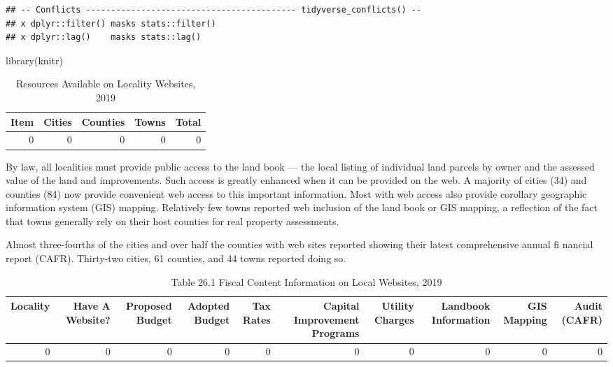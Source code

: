 \documentclass[
]{book}
\newenvironment{Shaded}{\begin{snugshade}}{\end{snugshade}}
\newcommand{\FunctionTok}[1]{\textcolor[rgb]{0.00,0.00,0.00}{#1}}
\newcommand{\NormalTok}[1]{#1}
\begin{document}
\begin{verbatim}
## -- Conflicts ------------------------------------------ tidyverse_conflicts() --
## x dplyr::filter() masks stats::filter()
## x dplyr::lag()    masks stats::lag()
\end{verbatim}

\begin{Shaded}
\begin{Highlighting}[]
\FunctionTok{library}\NormalTok{(knitr)}
\end{Highlighting}
\end{Shaded}

\begin{table}

\caption{\label{tab:unnamed-chunk-2}Resources Available on Locality Websites, 2019}
\centering
\begin{tabular}[t]{r|r|r|r|r}
\hline
Item & Cities & Counties & Towns & Total\\
\hline
0 & 0 & 0 & 0 & 0\\
\hline
\end{tabular}
\end{table}

By law, all localities must provide public access to the land book --- the local listing of individual land parcels by owner and the assessed value of the land and improvements. Such access is greatly enhanced when it can be provided on the web. A majority of cities (34) and counties (84) now provide convenient web access to this important information. Most with web access also provide corollary geographic information system (GIS) mapping. Relatively few towns reported web inclusion of the land book or GIS mapping, a reflection of the fact that towns generally rely on their host counties for real property assessments.

Almost three-fourths of the cities and over half the counties with web sites reported showing their latest comprehensive annual fi nancial report (CAFR). Thirty-two cities, 61 counties, and 44 towns reported doing so.

\begin{table}

\caption{\label{tab:unnamed-chunk-3}Table 26.1 Fiscal Content Information on Local Websites, 2019}
\centering
\begin{tabular}[t]{r|r|r|r|r|r|r|r|r|r}
\hline
Locality & Have A Website? & Proposed Budget & Adopted Budget & Tax Rates & Capital Improvement Programs & Utility Charges & Landbook Information & GIS Mapping & Audit (CAFR)\\
\hline
0 & 0 & 0 & 0 & 0 & 0 & 0 & 0 & 0 & 0\\
\hline
\end{tabular}
\end{table}
\end{document}
